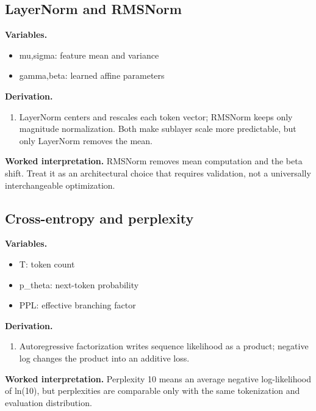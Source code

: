 \subsection{LayerNorm and RMSNorm}
\textbf{Variables.}\begin{itemize}
\item mu,sigma: feature mean and variance
\item gamma,beta: learned affine parameters
\end{itemize}
\textbf{Derivation.}\begin{derivation}\begin{enumerate}
\item LayerNorm centers and rescales each token vector; RMSNorm keeps only magnitude normalization. Both make sublayer scale more predictable, but only LayerNorm removes the mean.
\end{enumerate}\end{derivation}
\textbf{Worked interpretation.} RMSNorm removes mean computation and the beta shift. Treat it as an architectural choice that requires validation, not a universally interchangeable optimization.
\subsection{Cross-entropy and perplexity}
\textbf{Variables.}\begin{itemize}
\item T: token count
\item p\_theta: next-token probability
\item PPL: effective branching factor
\end{itemize}
\textbf{Derivation.}\begin{derivation}\begin{enumerate}
\item Autoregressive factorization writes sequence likelihood as a product; negative log changes the product into an additive loss.
\end{enumerate}\end{derivation}
\textbf{Worked interpretation.} Perplexity 10 means an average negative log-likelihood of ln(10), but perplexities are comparable only with the same tokenization and evaluation distribution.
